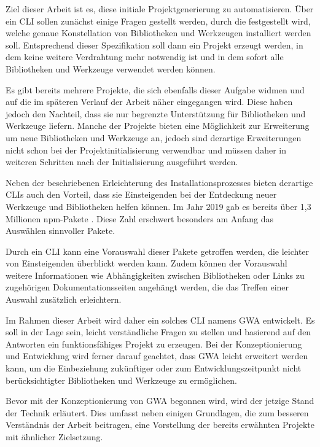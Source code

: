 Ziel dieser Arbeit ist es, diese initiale Projektgenerierung zu automatisieren. Über ein \gls{CLI} sollen zunächst einige Fragen gestellt werden, durch die festgestellt wird, welche genaue Konstellation von Bibliotheken und Werkzeugen installiert werden soll. Entsprechend dieser Spezifikation soll dann ein Projekt erzeugt werden, in dem keine weitere Verdrahtung mehr notwendig ist und in dem sofort alle Bibliotheken und Werkzeuge verwendet werden können.

Es gibt bereits mehrere Projekte, die sich ebenfalls dieser Aufgabe widmen und auf die im späteren Verlauf der Arbeit näher eingegangen wird. Diese haben jedoch den Nachteil, dass sie nur begrenzte Unterstützung für Bibliotheken und Werkzeuge liefern. Manche der Projekte bieten eine Möglichkeit zur Erweiterung um neue Bibliotheken und Werkzeuge an, jedoch sind derartige Erweiterungen nicht schon bei der Projektinitialisierung verwendbar und müssen daher in weiteren Schritten nach der Initialisierung ausgeführt werden.

Neben der beschriebenen Erleichterung des Installationsprozesses bieten derartige \gls{CLI}s auch den Vorteil, dass sie Einsteigenden bei der Entdeckung neuer Werkzeuge und Bibliotheken helfen können. Im Jahr 2019 gab es bereits über 1,3 Millionen \gls{npm}-Pakete \cite{npm_package_count}. Diese Zahl erschwert besonders am Anfang das Auswählen sinnvoller Pakete.

Durch ein \gls{CLI} kann eine Vorauswahl dieser Pakete getroffen werden, die leichter von Einsteigenden überblickt werden kann. Zudem können der Vorauswahl weitere Informationen wie Abhängigkeiten zwischen Bibliotheken oder Links zu zugehörigen Dokumentationsseiten angehängt werden, die das Treffen einer Auswahl zusätzlich erleichtern.

Im Rahmen dieser Arbeit wird daher ein solches \gls{CLI} namens \gls{GWA} entwickelt. Es soll in der Lage sein, leicht verständliche Fragen zu stellen und basierend auf den Antworten ein funktionsfähiges Projekt zu erzeugen. Bei der Konzeptionierung und Entwicklung wird ferner darauf geachtet, dass \gls{GWA} leicht erweitert werden kann, um die Einbeziehung zukünftiger oder zum Entwicklungszeitpunkt nicht berücksichtigter Bibliotheken und Werkzeuge zu ermöglichen.

Bevor mit der Konzeptionierung von \gls{GWA} begonnen wird, wird der jetzige Stand der Technik erläutert. Dies umfasst neben einigen Grundlagen, die zum besseren Verständnis der Arbeit beitragen, eine Vorstellung der bereits erwähnten Projekte mit ähnlicher Zielsetzung.

